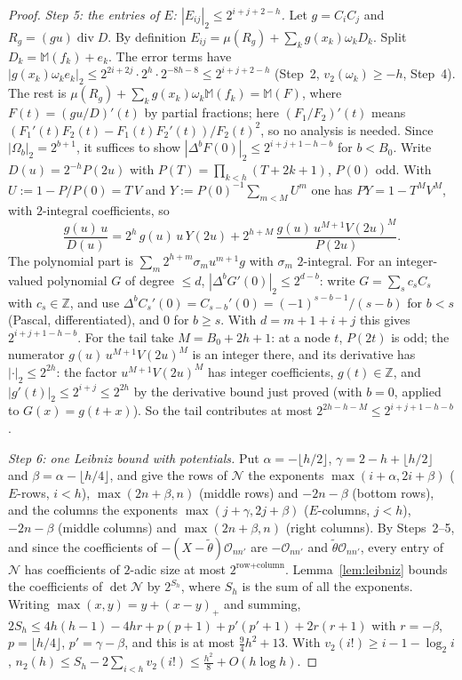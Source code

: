 \documentclass[11pt]{amsart}
\theoremstyle{definition}
\theoremstyle{remark}
\numberwithin{equation}{section}
\newcommand{\ZZ}{\mathbb{Z}}
\begin{document}
\begin{proof}
\emph{Step 5: the entries of $E$: $|E_{ij}|_2\le2^{i+j+2-h}$.} Let $g=C_iC_j$ and $R_g=(gu)\operatorname{div}D$. By
definition $E_{ij}=\mu(R_g)+\sum_kg(x_k)\omega_kD_k$. Split $D_k=\mathbb M(f_k)+e_k$. The error terms have
$|g(x_k)\omega_ke_k|_2\le2^{2i+2j}\cdot2^h\cdot2^{-8h-8}\le2^{i+j+2-h}$ (Step~2, $v_2(\omega_k)\ge-h$, Step~4). The rest is
$\mu(R_g)+\sum_kg(x_k)\omega_k\mathbb M(f_k)=\mathbb M(F)$, where $F(t)=(gu/D)'(t)$ by partial fractions; here $(F_1/F_2)'(t)$
means $(F_1'(t)F_2(t)-F_1(t)F_2'(t))/F_2(t)^2$, so no analysis is needed. Since $|\Omega_b|_2=2^{b+1}$, it suffices to show
$|\Delta^bF(0)|_2\le2^{i+j+1-h-b}$ for $b<B_0$. Write $D(u)=2^{-h}P(2u)$ with $P(T)=\prod_{k<h}(T+2k+1)$, $P(0)$ odd. With
$U:=1-P/P(0)=T\,V$ and $Y:=P(0)^{-1}\sum_{m<M}U^m$ one has $PY=1-T^MV^M$, with $2$-integral coefficients, so
\[
  \frac{g(u)\,u}{D(u)}=2^h\,g(u)\,u\,Y(2u)+2^{h+M}\,\frac{g(u)\,u^{M+1}V(2u)^M}{P(2u)} .
\]
The polynomial part is $\sum_m2^{h+m}\sigma_mu^{m+1}g$ with $\sigma_m$ $2$-integral. For an integer-valued polynomial $G$ of
degree $\le d$, $|\Delta^bG'(0)|_2\le2^{d-b}$: write $G=\sum_sc_sC_s$ with $c_s\in\ZZ$, and use
$\Delta^bC_s'(0)=C_{s-b}'(0)=(-1)^{s-b-1}/(s-b)$ for $b<s$ (Pascal, differentiated), and $0$ for $b\ge s$. With
$d=m+1+i+j$ this gives $2^{i+j+1-h-b}$. For the tail take $M=B_0+2h+1$: at a node $t$, $P(2t)$ is odd; the numerator
$g(u)\,u^{M+1}V(2u)^M$ is an integer there, and its derivative has $|\cdot|_2\le2^{2h}$: the factor $u^{M+1}V(2u)^M$
has integer coefficients, $g(t)\in\ZZ$, and $|g'(t)|_2\le2^{i+j}\le2^{2h}$ by the derivative bound just proved (with
$b=0$, applied to $G(x)=g(t+x)$). So the tail contributes at most $2^{2h-h-M}\le2^{i+j+1-h-b}$.

\emph{Step 6: one Leibniz bound with potentials.} Put $\alpha=-\lfloor h/2\rfloor$, $\gamma=2-h+\lfloor h/2\rfloor$ and
$\beta=\alpha-\lfloor h/4\rfloor$, and give the rows of $\mathcal N$ the exponents $\max(i+\alpha,2i+\beta)$ ($E$-rows,
$i<h$), $\max(2n+\beta,n)$ (middle rows) and $-2n-\beta$ (bottom rows), and the columns the exponents
$\max(j+\gamma,2j+\beta)$ ($E$-columns, $j<h$), $-2n-\beta$ (middle columns) and $\max(2n+\beta,n)$ (right columns). By
Steps~2--5, and since the coefficients of $-(X-\tilde\theta)\mathcal O_{nn'}$ are $-\mathcal O_{nn'}$ and
$\tilde\theta\mathcal O_{nn'}$, every entry of $\mathcal N$ has coefficients of $2$-adic size at most
$2^{\text{row}+\text{column}}$. Lemma~\ref{lem:leibniz} bounds the coefficients of $\det\mathcal N$ by $2^{S_h}$, where $S_h$
is the sum of all the exponents. Writing $\max(x,y)=y+(x-y)_+$ and summing,
$2S_h\le4h(h-1)-4hr+p(p+1)+p'(p'+1)+2r(r+1)$ with $r=-\beta$, $p=\lfloor h/4\rfloor$, $p'=\gamma-\beta$, and this is at most
$\frac94h^2+13$. With $v_2(i!)\ge i-1-\log_2i$, $n_2(h)\le S_h-2\sum_{i<h}v_2(i!)\le\frac{h^2}8+O(h\log h)$.
\end{proof}
\end{document}
